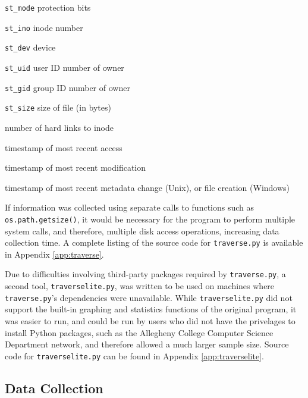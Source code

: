 \documentclass[12pt,a4paper]{article}
\begin{document}
			\begin{description}[leftmargin=3cm, style=sameline]
				\begin{multicols}{2}
					\item[\texttt{st\_mode}]{protection bits}
					\item[\texttt{st\_ino}]{inode number}
					\item[\texttt{st\_dev}]{device}
					\item[\texttt{st\_uid}]{user ID number of owner}
					\item[\texttt{st\_gid}]{group ID number of owner}
					\item[\texttt{st\_size}]{size of file (in bytes)}
				\end{multicols}
				\item[\texttt{st\_nlink}]{number of hard links to inode}
				\item[\texttt{st\_atime}]{timestamp of most recent access}
				\item[\texttt{st\_mtime}]{timestamp of most recent modification}
				\item[\texttt{st\_ctime}]{timestamp of most recent metadata change (Unix), or file creation \allowbreak(Windows)}
			\end{description}

			If information was collected using separate calls to functions such as \\\texttt{os.path.getsize()}, it would be necessary for the program to perform multiple system calls, and therefore, multiple disk access operations, increasing data collection time. 
			A complete listing of the source code for \texttt{traverse.py} is available in Appendix \ref{app:traverse}.

			Due to difficulties involving third-party packages required by \texttt{traverse.py}, a second tool, \texttt{traverselite.py}, was written to be used on machines where \texttt{traverse.py}'s dependencies were unavailable. While \texttt{traverselite.py} did not support the built-in graphing and statistics functions of the original program, it was easier to run, and could be run by users who did not have the privelages to install Python packages, such as the Allegheny College Computer Science Department network, and therefore allowed a much larger sample size. Source code for \texttt{traverselite.py} can be found in Appendix \ref{app:traverselite}.

		\subsection{Data Collection}
\end{document}

